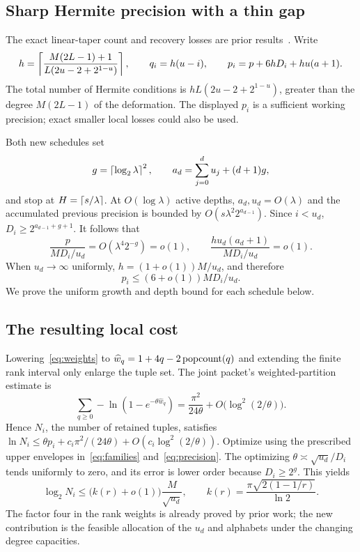 \subsection{Sharp Hermite precision with a thin gap}
The exact linear-taper count and recovery losses are prior
results~\cite{contraction,precision}. Write
\begin{equation}\label{eq:hermite}
 h=\left\lceil\frac{M(2L-1)+1}{L(2u-2+2^{1-u})}\right\rceil,\qquad
 q_i=h(u-i),\qquad
 p_i=p+6hD_i+hu(a+1).
\end{equation}
The total number of Hermite conditions is
$hL(2u-2+2^{1-u})$, greater than the degree $M(2L-1)$ of the deformation.
The displayed $p_i$ is a sufficient working precision; exact smaller local
losses could also be used.

Both new schedules set
\begin{equation}\label{eq:gap}
 g=\left\lceil\log_2\lambda\right\rceil^{2},\qquad
 a_d=\sum_{j=0}^du_j+(d+1)g,
\end{equation}
and stop at $H=\left\lceil s/\lambda\right\rceil$. At $O(\log\lambda)$ active depths,
$a_d,u_d=O(\lambda)$ and the accumulated previous precision is bounded by
$O(s\lambda^2 2^{a_{d-1}})$. Since $i<u_d$,
$D_i\ge2^{a_{d-1}+g+1}$. It follows that
\[
 \frac{p}{MD_i/u_d}=O(\lambda^4 2^{-g})=o(1),\qquad
 \frac{hu_d(a_d+1)}{MD_i/u_d}=o(1).
\]
When $u_d\to\infty$ uniformly, $h=(1+o(1))M/u_d$, and therefore
\begin{equation}\label{eq:precision}
 p_i\le(6+o(1))MD_i/u_d.
\end{equation}
We prove the uniform growth and depth bound for each schedule below.

\subsection{The resulting local cost}
Lowering~\eqref{eq:weights} to $\widehat w_q=1+4q-2\operatorname{popcount}(q)$ and extending
the finite rank interval only enlarge the tuple set. The joint packet's
weighted-partition estimate is
\[
 \sum_{q\ge0}-\ln(1-e^{-\theta\widehat w_q})
 =\frac{\pi^2}{24\theta}+O\bigl(\log^2(2/\theta)\bigr).
\]
Hence $N_i$, the number of retained tuples, satisfies
$\ln N_i\le\theta p_i+c_i\pi^2/(24\theta)+
O(c_i\log^2(2/\theta))$. Optimize using the prescribed upper envelopes
in~\eqref{eq:families} and~\eqref{eq:precision}. The optimizing
$\theta\asymp\sqrt{u_d}/D_i$ tends uniformly to zero, and its error is
lower order because $D_i\ge2^g$. This yields
\begin{equation}\label{eq:local-entropy}
 \log_2 N_i\le\bigl(k(r)+o(1)\bigr)\frac{M}{\sqrt{u_d}},
 \qquad k(r)=\frac{\pi\sqrt{2(1-1/r)}}{\ln2}.
\end{equation}
The factor four in the rank weights is already proved by prior work; the
new contribution is the feasible allocation of the $u_d$ and alphabets
under the changing degree capacities.

